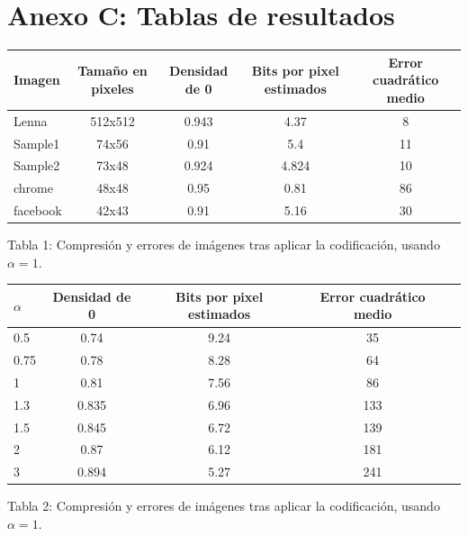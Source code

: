 \documentclass[%
	final,
	reprint,
	notitlepage,
	narroweqnarray,
	inline,
	twoside,
	invited
	]{ieee}
\begin{document}

\section*{Anexo C: Tablas de resultados}

\begin{center}
	\begin{tabular}{|l || c | c | c | c|}
		\hline
		\textbf{Imagen} & \textbf{Tamaño en pixeles} & \textbf{Densidad de 0} & \textbf{Bits por pixel estimados} & \textbf{Error cuadrático medio}\\
		\hline
		\hline
		Lenna & 512x512 & 0.943 & 4.37 & 8\\
		Sample1 & 74x56 & 0.91 & 5.4 & 11\\
		Sample2 & 73x48 & 0.924 & 4.824 & 10\\
		chrome & 48x48 & 0.95 & 0.81 & 86\\
		facebook & 42x43 & 0.91 & 5.16 & 30\\
		\hline
	\end{tabular}
\end{center}
\begin{center}
Tabla 1: Compresión y errores de imágenes tras aplicar la codificación, usando $\alpha=1$.
\end{center}

\begin{center}
	\begin{tabular}{|l || c | c | c | c|}
		\hline
		\textbf{$\alpha$} & \textbf{Densidad de 0} & \textbf{Bits por pixel estimados} & \textbf{Error cuadrático medio}\\
		\hline
		\hline
		0.5 & 0.74 & 9.24 & 35\\
		0.75 & 0.78 & 8.28 & 64\\
		1 & 0.81 & 7.56 & 86\\
		1.3 & 0.835 & 6.96 & 133\\
		1.5 & 0.845 & 6.72 & 139\\
		2 & 0.87 & 6.12 & 181\\
		3 & 0.894 & 5.27 & 241\\
		\hline
	\end{tabular}
\end{center}
\begin{center}
Tabla 2: Compresión y errores de imágenes tras aplicar la codificación, usando $\alpha=1$.
\end{center}
\end{document}
